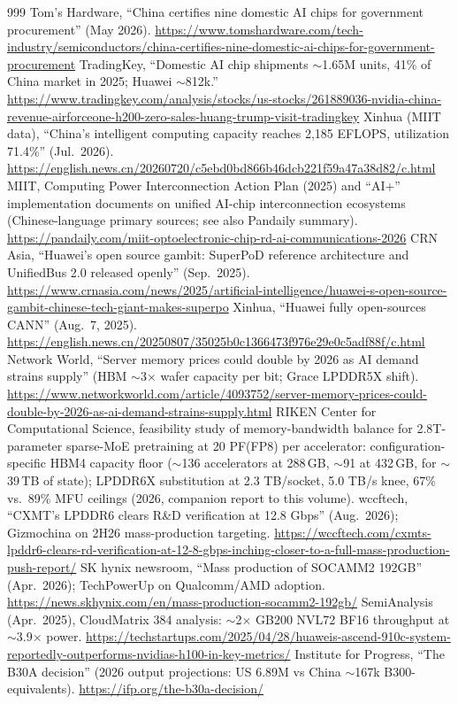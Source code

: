 \begin{thebibliography}{999}
 Tom's Hardware, ``China certifies nine domestic AI chips for government procurement'' (May 2026). \url{https://www.tomshardware.com/tech-industry/semiconductors/china-certifies-nine-domestic-ai-chips-for-government-procurement}
 TradingKey, ``Domestic AI chip shipments $\sim$1.65M units, 41\% of China market in 2025; Huawei $\sim$812k.'' \url{https://www.tradingkey.com/analysis/stocks/us-stocks/261889036-nvidia-china-revenue-airforceone-h200-zero-sales-huang-trump-visit-tradingkey}
 Xinhua (MIIT data), ``China's intelligent computing capacity reaches 2,185 EFLOPS, utilization 71.4\%'' (Jul.\ 2026). \url{https://english.news.cn/20260720/c5ebd0bd866b46dcb221f59a47a38d82/c.html}
 MIIT, Computing Power Interconnection Action Plan (2025) and ``AI+'' implementation documents on unified AI-chip interconnection ecosystems (Chinese-language primary sources; see also Pandaily summary). \url{https://pandaily.com/miit-optoelectronic-chip-rd-ai-communications-2026}
 CRN Asia, ``Huawei's open source gambit: SuperPoD reference architecture and UnifiedBus 2.0 released openly'' (Sep.\ 2025). \url{https://www.crnasia.com/news/2025/artificial-intelligence/huawei-s-open-source-gambit-chinese-tech-giant-makes-superpo}
 Xinhua, ``Huawei fully open-sources CANN'' (Aug.\ 7, 2025). \url{https://english.news.cn/20250807/35025b0c1366473f976e29e0c5adf88f/c.html}
 Network World, ``Server memory prices could double by 2026 as AI demand strains supply'' (HBM $\sim$3$\times$ wafer capacity per bit; Grace LPDDR5X shift). \url{https://www.networkworld.com/article/4093752/server-memory-prices-could-double-by-2026-as-ai-demand-strains-supply.html}
 RIKEN Center for Computational Science, feasibility study of memory-bandwidth balance for 2.8T-parameter sparse-MoE pretraining at 20 PF(FP8) per accelerator: configuration-specific HBM4 capacity floor ($\sim$136 accelerators at 288\,GB, $\sim$91 at 432\,GB, for $\sim$39\,TB of state); LPDDR6X substitution at 2.3 TB/socket, 5.0 TB/s knee, 67\% vs.\ 89\% MFU ceilings (2026, companion report to this volume).
 wccftech, ``CXMT's LPDDR6 clears R\&D verification at 12.8 Gbps'' (Aug.\ 2026); Gizmochina on 2H26 mass-production targeting. \url{https://wccftech.com/cxmts-lpddr6-clears-rd-verification-at-12-8-gbps-inching-closer-to-a-full-mass-production-push-report/}
 SK hynix newsroom, ``Mass production of SOCAMM2 192GB'' (Apr.\ 2026); TechPowerUp on Qualcomm/AMD adoption. \url{https://news.skhynix.com/en/mass-production-socamm2-192gb/}
 SemiAnalysis (Apr.\ 2025), CloudMatrix 384 analysis: $\sim$2$\times$ GB200 NVL72 BF16 throughput at $\sim$3.9$\times$ power. \url{https://techstartups.com/2025/04/28/huaweis-ascend-910c-system-reportedly-outperforms-nvidias-h100-in-key-metrics/}
 Institute for Progress, ``The B30A decision'' (2026 output projections: US 6.89M vs China $\sim$167k B300-equivalents). \url{https://ifp.org/the-b30a-decision/}


\end{thebibliography}

